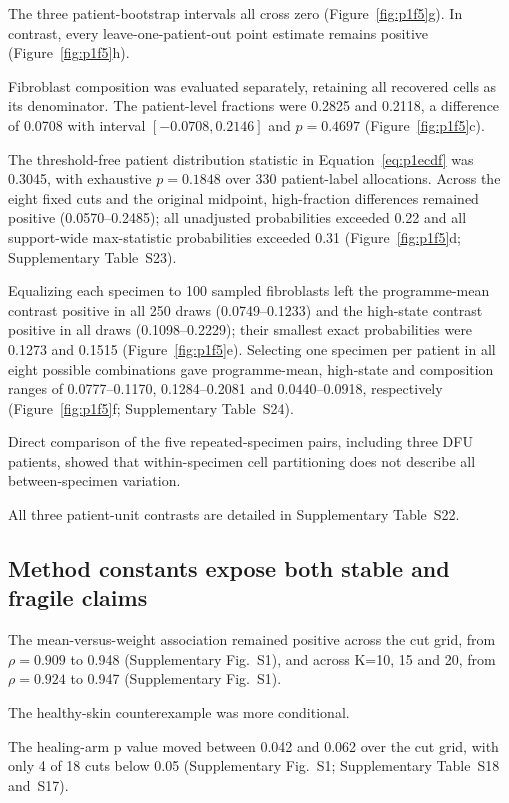 \documentclass[10pt,a4paper]{article}
\begin{document}
The three patient-bootstrap intervals all cross zero (Figure~\ref{fig:p1f5}g). In contrast, every leave-one-patient-out point estimate remains positive (Figure~\ref{fig:p1f5}h).

Fibroblast composition was evaluated separately, retaining all recovered cells as its denominator. The patient-level fractions were 0.2825 and 0.2118, a difference of 0.0708 with interval $[-0.0708,0.2146]$ and $p=0.4697$ (Figure~\ref{fig:p1f5}c).

The threshold-free patient distribution statistic in Equation~\eqref{eq:p1ecdf} was 0.3045, with exhaustive $p=0.1848$ over 330 patient-label allocations. Across the eight fixed cuts and the original midpoint, high-fraction differences remained positive (0.0570--0.2485); all unadjusted probabilities exceeded 0.22 and all support-wide max-statistic probabilities exceeded 0.31 (Figure~\ref{fig:p1f5}d; Supplementary Table~S23).

Equalizing each specimen to 100 sampled fibroblasts left the programme-mean contrast positive in all 250 draws (0.0749--0.1233) and the high-state contrast positive in all draws (0.1098--0.2229); their smallest exact probabilities were 0.1273 and 0.1515 (Figure~\ref{fig:p1f5}e). Selecting one specimen per patient in all eight possible combinations gave programme-mean, high-state and composition ranges of 0.0777--0.1170, 0.1284--0.2081 and 0.0440--0.0918, respectively (Figure~\ref{fig:p1f5}f; Supplementary Table~S24).

Direct comparison of the five repeated-specimen pairs, including three DFU patients, showed that within-specimen cell partitioning does not describe all between-specimen variation.

All three patient-unit contrasts are detailed in Supplementary Table~S22.

\subsection{Method constants expose both stable and fragile claims}


The mean-versus-weight association remained positive across the cut grid, from $\rho=0.909$ to 0.948 (Supplementary Fig.~S1\label{call:p1f6}), and across K=10, 15 and 20, from $\rho=0.924$ to 0.947 (Supplementary Fig.~S1).

The healthy-skin counterexample was more conditional.

The healing-arm p value moved between 0.042 and 0.062 over the cut grid, with only 4 of 18 cuts below 0.05 (Supplementary Fig.~S1; Supplementary Table~S18 and~S17).
\end{document}
